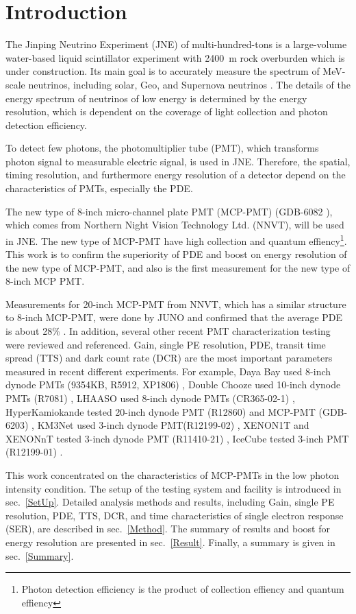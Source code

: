 \section{Introduction}
The Jinping Neutrino Experiment (JNE) of multi-hundred-tons is a large-volume water-based liquid scintillator experiment with \SI{2400}{m} rock overburden \cite{LetterJNE2017} which is under construction. Its main goal is to accurately measure the spectrum of MeV-scale neutrinos, including solar, Geo, and Supernova neutrinos \cite{LetterJNE2017}. The details of the energy spectrum of neutrinos of low energy is determined by the energy resolution, which is dependent on the coverage of light collection and photon detection efficiency.

To detect few photons, the photomultiplier tube (PMT), which transforms photon signal to measurable electric signal, is used in JNE. Therefore, the spatial, timing resolution, and furthermore energy resolution of a detector depend on the characteristics of PMTs, especially the PDE.

The new type of 8-inch micro-channel plate PMT (MCP-PMT) (GDB-6082 \cite{GDB-6082}), which comes from Northern Night Vision Technology Ltd. (NNVT), will be used in JNE. The new type of MCP-PMT have high collection and quantum effiency\footnote{Photon detection efficiency is the product of collection effiency and quantum effiency}. This work is to confirm the superiority of PDE and boost on energy resolution of the new type of MCP-PMT, and also is the first measurement for the new type of 8-inch MCP PMT.

Measurements for 20-inch MCP-PMT from NNVT, which has a similar structure to 8-inch MCP-PMT, were done by JUNO and confirmed that the average PDE is about 28\% \cite{JUNOMassTesting}. In addition, several other recent PMT characterization testing were reviewed and referenced. Gain, single PE resolution, PDE, transit time spread (TTS) and dark count rate (DCR) are the most important parameters measured in recent different experiments. For example, Daya Bay used 8-inch dynode PMTs (9354KB, R5912, XP1806) \cite{DayaBayTesting}, Double Chooze used 10-inch dynode PMTs (R7081) \cite{DoubleChoozeTesting}, LHAASO used 8-inch dynode PMTs (CR365-02-1) \cite{LHAASOTesting}, HyperKamiokande tested 20-inch dynode PMT (R12860) and MCP-PMT (GDB-6203) \cite{HyperKTesting}, KM3Net used 3-inch dynode PMT(R12199-02) \cite{KM3NetTesting}, XENON1T and XENONnT tested 3-inch dynode PMT (R11410-21) \cite{XENON1TTesting}\cite{XENONnTTesting}, IceCube tested 3-inch PMT (R12199-01) \cite{IceCubeTesting}.

This work concentrated on the characteristics of MCP-PMTs in the low photon intensity condition. The setup of the testing system and facility is introduced in sec.~\ref{SetUp}. Detailed analysis methods and results, including Gain, single PE resolution, PDE, TTS, DCR, and time characteristics of single electron response (SER), are described in sec.~\ref{Method}. The summary of results and boost for energy resolution are presented in sec.~\ref{Result}. Finally, a summary is given in sec.~\ref{Summary}.